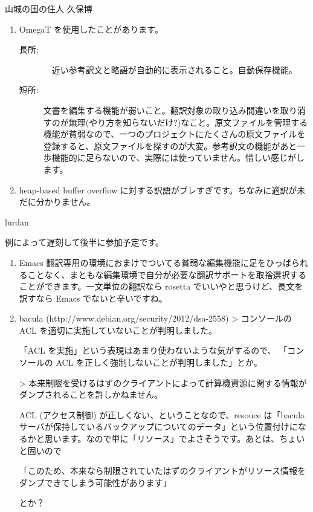 \documentclass[mingoth,a4paper]{jsarticle}
\begin{document}
\begin{prework}{ 山城の国の住人 久保博 }
\begin{enumerate}
\item OmegaT を使用したことがあります。
\begin{description}
\item [長所:]　近い参考訳文と略語が自動的に表示されること。自動保存機能。
\item [短所:] 文書を編集する機能が弱いこと。翻訳対象の取り込み間違いを取り消すのが無理(やり方を知らないだけ?)なこと。原文ファイルを管理する機能が貧弱なので、一つのプロジェクトにたくさんの原文ファイルを登録すると、原文ファイルを探すのが大変。参考訳文の機能があと一歩機能的に足らないので、実際には使っていません。惜しい感じがします。
\end{description}

\item heap-based buffer overflow に対する訳語がブレすぎです。ちなみに適訳が未だに分かりません。
\end{enumerate}

\end{prework}

\begin{prework}{ lurdan }

例によって遅刻して後半に参加予定です。

\begin{enumerate}
\item Emacs
翻訳専用の環境におまけでついてる貧弱な編集機能に足をひっぱられることなく、まともな編集環境で自分が必要な翻訳サポートを取捨選択することができます。一文単位の翻訳なら rosetta でいいやと思うけど、長文を訳すなら Emacs でないと辛いですね。

\item bacula (http://www.debian.org/security/2012/dsa-2558)
> コンソールの ACL を適切に実施していないことが判明しました。

「ACL を実施」という表現はあまり使わないような気がするので、
「コンソールの ACL を正しく強制しないことが判明しました」とか。

> 本来制限を受けるはずのクライアントによって計算機資源に関する情報がダンプされることを許しかねません。

ACL (アクセス制御) が正しくない、ということなので、resouce は「bacula サーバが保持しているバックアップについてのデータ」という位置付けになるかと思います。なので単に「リソース」でよさそうです。あとは、ちょいと固いので

「このため、本来なら制限されていたはずのクライアントがリソース情報をダンプできてしまう可能性があります」

とか？
\end{enumerate}

\end{prework}
\end{document}
